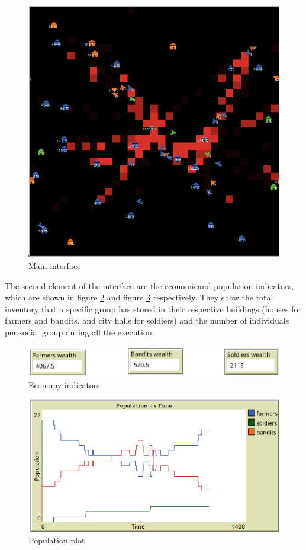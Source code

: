 \documentclass{wscpaperproc}
\begin{document}
\begin{figure}[h!]
    \centering
    \includegraphics[scale=0.65]{Images/Interface1}
    \caption{Main interface}
    \label{imp:main_interface1}
\end{figure}

The second element of the interface are the economicand pupulation indicators,
which are shown in figure \ref{imp:economy1} and figure
\ref{imp:population_plot1} respectively. They show the total inventory that
a specific group has stored in their respective buildings (houses for
farmers and bandits, and city halls for soldiers) and the number of
individuals per social group during all the execution.

\begin{figure}[h!]
    \centering
    \includegraphics[scale=0.5]{Images/Economy1}
    \caption{Economy indicators}
    \label{imp:economy1}
\end{figure}

\begin{figure}[h!]
    \centering
    \includegraphics[scale=0.5]{Images/Population1}
    \caption{Population plot}
    \label{imp:population_plot1}
\end{figure}
\end{document}
